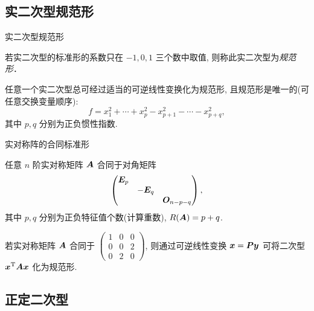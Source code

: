 \subsection{实二次型规范形}

\begin{frame}{实二次型规范形}
	\onslide<+->
	\begin{definition}
		若实二次型的标准形的系数只在 $-1, 0, 1$ 三个数中取值, 则称此实二次型为\emph{规范形}．
	\end{definition}
	\onslide<+->
	\begin{theorem}
		任意一个实二次型总可经过适当的可逆线性变换化为规范形, 且规范形是唯一的(可任意交换变量顺序):
		\[f=x_1^2+\cdots+x_p^2-x_{p+1}^2-\cdots-x_{p+q}^2,\]
		其中 $p,q$ 分别为正负惯性指数.
	\end{theorem}
\end{frame}


\begin{frame}{实对称阵的合同标准形}
	\onslide<+->
	\begin{corollary}
		任意 $n$ 阶实对称矩阵 ${\boldsymbol{A}}$ 合同于对角矩阵
		\[\begin{pmatrix}
			{\boldsymbol{E}}_p&&\\
			&-{\boldsymbol{E}}_q&\\
			&&{\boldsymbol{O}}_{n-p-q}
		\end{pmatrix},\]
		其中 $p,q$ 分别为正负特征值个数(计算重数), $R({\boldsymbol{A}})=p+q$.
	\end{corollary}
	\onslide<+->
	\begin{example}
		若实对称矩阵 ${\boldsymbol{A}}$ 合同于 $\begin{pmatrix}
			1&0&0\\0&0&2\\0&2&0
		\end{pmatrix}$, 则通过可逆线性变换 ${\boldsymbol{x}}={\boldsymbol{P}}{\boldsymbol{y}}$ 可将二次型 ${\boldsymbol{x}}^{\mathrm{T}}{\boldsymbol{A}}{\boldsymbol{x}}$ 化为规范形.
	\end{example}
\end{frame}

\subsection{正定二次型}

